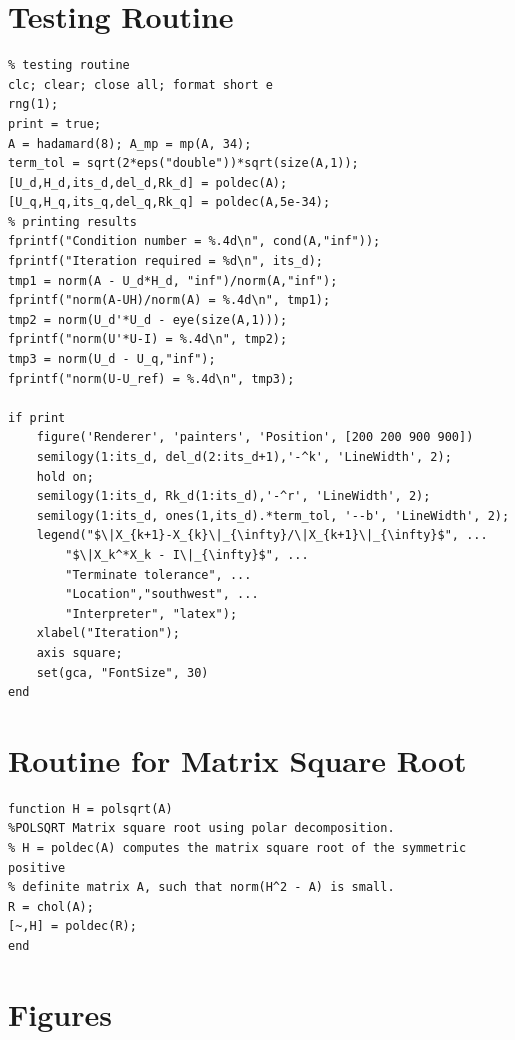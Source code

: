 \documentclass[12pt]{article}
\begin{document}
\section{Testing Routine} \label{app:testingroutine}
\begin{lstlisting}
% testing routine
clc; clear; close all; format short e
rng(1);
print = true;
A = hadamard(8); A_mp = mp(A, 34);
term_tol = sqrt(2*eps("double"))*sqrt(size(A,1));
[U_d,H_d,its_d,del_d,Rk_d] = poldec(A);
[U_q,H_q,its_q,del_q,Rk_q] = poldec(A,5e-34);
% printing results
fprintf("Condition number = %.4d\n", cond(A,"inf"));
fprintf("Iteration required = %d\n", its_d);
tmp1 = norm(A - U_d*H_d, "inf")/norm(A,"inf");
fprintf("norm(A-UH)/norm(A) = %.4d\n", tmp1);
tmp2 = norm(U_d'*U_d - eye(size(A,1)));
fprintf("norm(U'*U-I) = %.4d\n", tmp2);
tmp3 = norm(U_d - U_q,"inf");
fprintf("norm(U-U_ref) = %.4d\n", tmp3);

if print 
    figure('Renderer', 'painters', 'Position', [200 200 900 900])
    semilogy(1:its_d, del_d(2:its_d+1),'-^k', 'LineWidth', 2);
    hold on;
    semilogy(1:its_d, Rk_d(1:its_d),'-^r', 'LineWidth', 2);
    semilogy(1:its_d, ones(1,its_d).*term_tol, '--b', 'LineWidth', 2);
    legend("$\|X_{k+1}-X_{k}\|_{\infty}/\|X_{k+1}\|_{\infty}$", ...
        "$\|X_k^*X_k - I\|_{\infty}$", ...
        "Terminate tolerance", ...
        "Location","southwest", ...
        "Interpreter", "latex");
    xlabel("Iteration");
    axis square;
    set(gca, "FontSize", 30)    
end
\end{lstlisting}

\section{Routine for Matrix Square Root}\label{app:matrix-squareroot}
\begin{lstlisting}
function H = polsqrt(A)
%POLSQRT Matrix square root using polar decomposition.
% H = poldec(A) computes the matrix square root of the symmetric positive
% definite matrix A, such that norm(H^2 - A) is small.
R = chol(A);
[~,H] = poldec(R);
end
\end{lstlisting}

\section{Figures}\label{app:figs}
\end{document}
